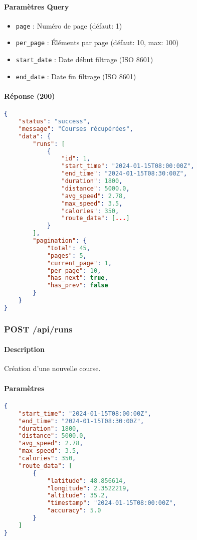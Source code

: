 \paragraph{Paramètres Query}
\begin{itemize}
    \item \texttt{page} : Numéro de page (défaut: 1)
    \item \texttt{per\_page} : Éléments par page (défaut: 10, max: 100)
    \item \texttt{start\_date} : Date début filtrage (ISO 8601)
    \item \texttt{end\_date} : Date fin filtrage (ISO 8601)
\end{itemize}

\paragraph{Réponse (200)}
\begin{lstlisting}[language=json]
{
    "status": "success",
    "message": "Courses récupérées",
    "data": {
        "runs": [
            {
                "id": 1,
                "start_time": "2024-01-15T08:00:00Z",
                "end_time": "2024-01-15T08:30:00Z",
                "duration": 1800,
                "distance": 5000.0,
                "avg_speed": 2.78,
                "max_speed": 3.5,
                "calories": 350,
                "route_data": [...]
            }
        ],
        "pagination": {
            "total": 45,
            "pages": 5,
            "current_page": 1,
            "per_page": 10,
            "has_next": true,
            "has_prev": false
        }
    }
}
\end{lstlisting}

\subsubsection{POST /api/runs}

\paragraph{Description}
Création d'une nouvelle course.

\paragraph{Paramètres}
\begin{lstlisting}[language=json]
{
    "start_time": "2024-01-15T08:00:00Z",
    "end_time": "2024-01-15T08:30:00Z",
    "duration": 1800,
    "distance": 5000.0,
    "avg_speed": 2.78,
    "max_speed": 3.5,
    "calories": 350,
    "route_data": [
        {
            "latitude": 48.856614,
            "longitude": 2.3522219,
            "altitude": 35.2,
            "timestamp": "2024-01-15T08:00:00Z",
            "accuracy": 5.0
        }
    ]
}
\end{lstlisting}

